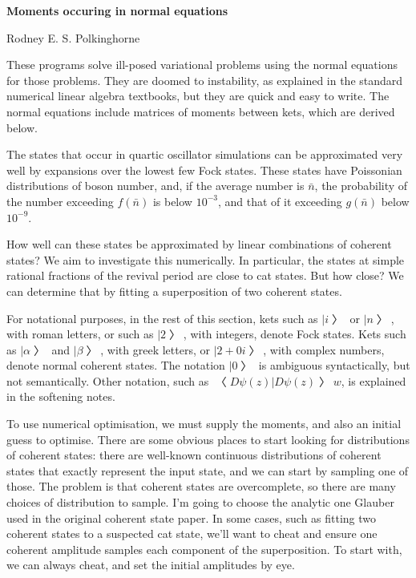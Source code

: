 


\centerline{\bf Moments occuring in normal equations}
\vskip 1cm
\centerline{Rodney E. S. Polkinghorne}

These programs solve ill-posed variational problems using the normal equations for those problems.  They are doomed to instability, as explained in the standard numerical linear algebra textbooks, but they are quick and easy to write.  The normal equations include matrices of moments between kets, which are derived below.


The states that occur in quartic oscillator simulations can be approximated very well by expansions over the lowest few Fock states.  These states have Poissonian distributions of boson number, and, if the average number is $\bar n$, the probability of the number exceeding $f(\bar n)$ is below $10^{-3}$, and that of it exceeding $g(\bar n)$ below $10^{-9}$.

How well can these states be approximated by linear combinations of coherent states?  We aim to investigate this numerically.  In particular, the states at simple rational fractions of the revival period are close to cat states.  But how close?  We can determine that by fitting a superposition of two coherent states.

For notational purposes, in the rest of this section, kets such as $|i〉$ or $|n〉$, with roman letters, or such as $|2〉$, with integers, denote Fock states.  Kets such as $|α〉$ and $|β〉$, with greek letters, or $|2+0i〉$, with complex numbers, denote normal coherent states.  The notation $|0〉$ is ambiguous syntactically, but not semantically.  Other notation, such as $〈Dψ(z)|Dψ(z)〉w$, is explained in the softening notes.

To use numerical optimisation, we must supply the moments, and also an initial guess to optimise.  There are some obvious places to start looking for distributions of coherent states: there are well-known continuous distributions of coherent states that exactly represent the input state, and we can start by sampling one of those.  The problem is that coherent states are overcomplete, so there are many choices of distribution to sample.  I'm going to choose the analytic one Glauber used in the original coherent state paper.  In some cases, such as fitting two coherent states to a suspected cat state, we'll want to cheat and ensure one coherent amplitude samples each component of the superposition.  To start with, we can always cheat, and set the initial amplitudes by eye.

